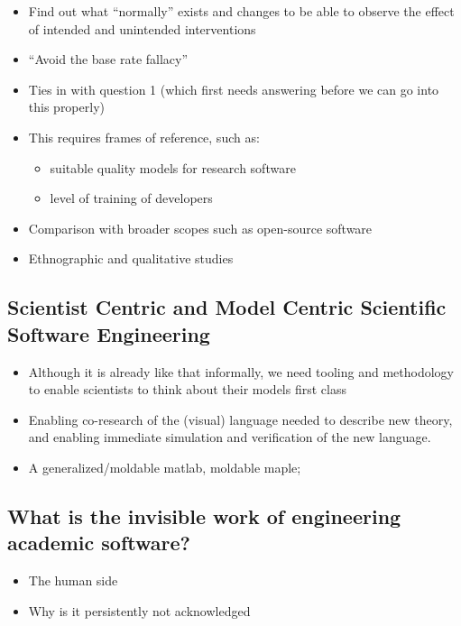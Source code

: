 \documentclass[a4paper,UKenglish]{dagman}
\begin{document}
\begin{itemize}

\item Find out what ``normally'' exists  and changes to be able to observe the effect of intended and unintended interventions
\item ``Avoid the base rate fallacy''
\item Ties in with question 1 (which first needs answering before we can go into this properly)
\item This requires frames of reference, such as:

    \begin{itemize}
    \item suitable quality models for research software
    \item level of training of developers
    \end{itemize}

\item Comparison with broader scopes such as open-source software
\item Ethnographic and qualitative studies
\end{itemize}

\subsection{Scientist Centric and Model Centric Scientific Software Engineering}


\begin{itemize}
\item Although it is already like that informally, we need tooling and methodology to enable scientists to think about their models first class
\item Enabling co-research of the (visual) language needed to describe new theory, and enabling immediate simulation and verification of the new language.
\item A generalized/moldable matlab, moldable maple;
\end{itemize}

\subsection{What is the invisible work of engineering academic software?}


\begin{itemize}
\item The human side
\item Why is it persistently not acknowledged
\end{itemize}
\end{document}

